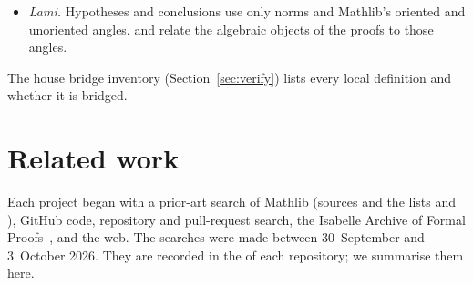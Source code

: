 \documentclass[11pt]{article}
\theoremstyle{definition}
\theoremstyle{remark}
\begin{document}
\begin{itemize}
 shows that the erected triangles are equilateral, and
 fixes their orientation (for bases with $P\ne Q$). Each local
definition has a bridge:  is Mathlib's 
(), and so are the Napoleon points
(, , );
for a unit complex number,  is Mathlib's  about~$P$
();  is half of
's area form (); and
$\omega_o=e^{-i\pi/3}$, $\omega_i=e^{i\pi/3}$ (, ).
\item \emph{Lami.} Hypotheses and conclusions use only norms and Mathlib's oriented and unoriented
angles.  and
 relate the algebraic objects of the proofs to those
angles.
\end{itemize}
The house bridge inventory (Section~\ref{sec:verify}) lists every local definition and whether it
is bridged.

\section{Related work}\label{sec:related}

Each project began with a prior-art search of Mathlib (sources and the lists
 and ), GitHub code, repository and pull-request search,
the Isabelle Archive of Formal Proofs~\cite{AFP}, and the web. The searches were made between
30~September and 3~October 2026. They are recorded in the  of each
repository; we summarise them here.
\end{document}
